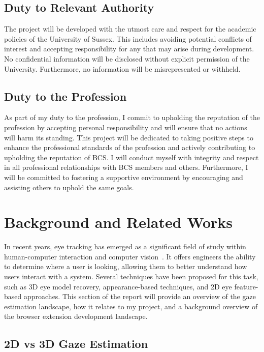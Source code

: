 \documentclass{report}
\begin{document}
\section{Duty to Relevant Authority}   

The project will be developed with the utmost care and respect for the academic policies of the University of Sussex. This includes avoiding potential conflicts of interest and accepting responsibility for any that may arise during development. No confidential information will be disclosed without explicit permission of the University. Furthermore, no information will be misrepresented or withheld. 

\section{Duty to the Profession}   

As part of my duty to the profession, I commit to upholding the reputation of the profession by accepting personal responsibility and will ensure that no actions will harm its standing. This project will be dedicated to taking positive steps to enhance the professional standards of the profession and actively contributing to upholding the reputation of BCS. I will conduct myself with integrity and respect in all professional relationships with BCS members and others. Furthermore, I will be committed to fostering a supportive environment by encouraging and assisting others to uphold the same goals. 

\chapter{Background and Related Works}
\label{chap:background}
\noindent
In recent years, eye tracking has emerged as a significant field of study within human-computer interaction and computer vision~\cite{cheng2021survey,kar2017review}. It offers engineers the ability to determine where a user is looking, allowing them to better understand how users interact with a system. Several techniques have been proposed for this task, such as 3D eye model recovery, appearance-based techniques, and 2D eye feature-based approaches. This section of the report will provide an overview of the gaze estimation landscape, how it relates to my project, and a background overview of the browser extension development landscape. 

\section{2D vs 3D Gaze Estimation} 
\end{document}
